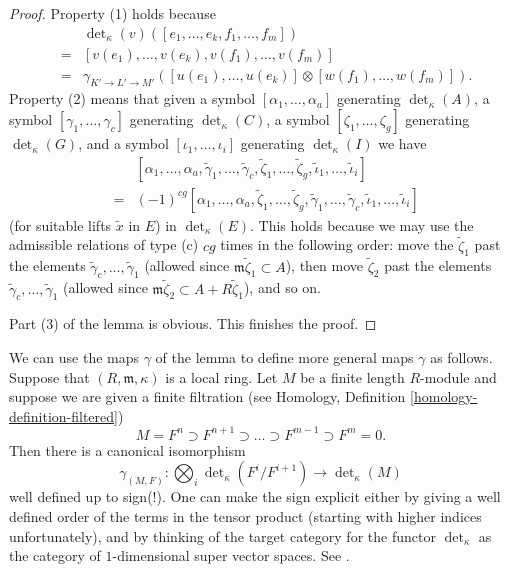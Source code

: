 \begin{proof}
\medskip\noindent
Property (1) holds because
\begin{eqnarray*}
& & \det\nolimits_\kappa(v)([e_1, \ldots, e_k, f_1, \ldots, f_m]) \\
& = &
[v(e_1), \ldots, v(e_k), v(f_1), \ldots, v(f_m)] \\
& = &
\gamma_{K' \to L' \to M'}([u(e_1), \ldots, u(e_k)]
\otimes [w(f_1), \ldots, w(f_m)]).
\end{eqnarray*}
Property (2) means that given a symbol
$[\alpha_1, \ldots, \alpha_a]$ generating $\det_\kappa(A)$,
a symbol $[\gamma_1, \ldots, \gamma_c]$ generating $\det_\kappa(C)$,
a symbol $[\zeta_1, \ldots, \zeta_g]$ generating $\det_\kappa(G)$, and
a symbol $[\iota_1, \ldots, \iota_i]$ generating $\det_\kappa(I)$
we have
\begin{eqnarray*}
& & [\alpha_1, \ldots, \alpha_a, \tilde\gamma_1, \ldots, \tilde\gamma_c,
\tilde\zeta_1, \ldots, \tilde\zeta_g, \tilde\iota_1, \ldots, \tilde\iota_i] \\
& = &
(-1)^{cg} [\alpha_1, \ldots, \alpha_a, \tilde\zeta_1, \ldots, \tilde\zeta_g,
\tilde\gamma_1, \ldots, \tilde\gamma_c, \tilde\iota_1, \ldots, \tilde\iota_i]
\end{eqnarray*}
(for suitable lifts $\tilde{x}$ in $E$) in $\det_\kappa(E)$.
This holds because we may use the admissible relations of type (c)
$cg$ times in the following order: move the
$\tilde\zeta_1$ past the elements
$\tilde\gamma_c, \ldots, \tilde\gamma_1$
(allowed since $\mathfrak m\tilde\zeta_1 \subset A$),
then move $\tilde\zeta_2$ past the elements
$\tilde\gamma_c, \ldots, \tilde\gamma_1$
(allowed since $\mathfrak m\tilde\zeta_2 \subset A + R\tilde\zeta_1$),
and so on.

\medskip\noindent
Part (3) of the lemma is obvious.
This finishes the proof.
\end{proof}

\noindent
We can use the maps $\gamma$ of the lemma to define more general maps
$\gamma$ as follows. Suppose that $(R, \mathfrak m, \kappa)$ is a
local ring. Let $M$ be a finite length $R$-module and suppose we
are given a finite filtration (see
Homology, Definition \ref{homology-definition-filtered})
$$
M = F^n \supset F^{n + 1} \supset \ldots \supset F^{m - 1} \supset F^m = 0.
$$
Then there is a canonical isomorphism
$$
\gamma_{(M, F)} :
\bigotimes\nolimits_i \det\nolimits_\kappa(F^i/F^{i + 1})
\longrightarrow
\det\nolimits_\kappa(M)
$$
well defined up to sign(!). One can make the sign explicit either by
giving a well defined order of the terms in the tensor product (starting with
higher indices unfortunately), and by thinking of the target category for
the functor $\det_\kappa$ as the category of
$1$-dimensional super vector spaces. See \cite[Section 1]{determinant}.

